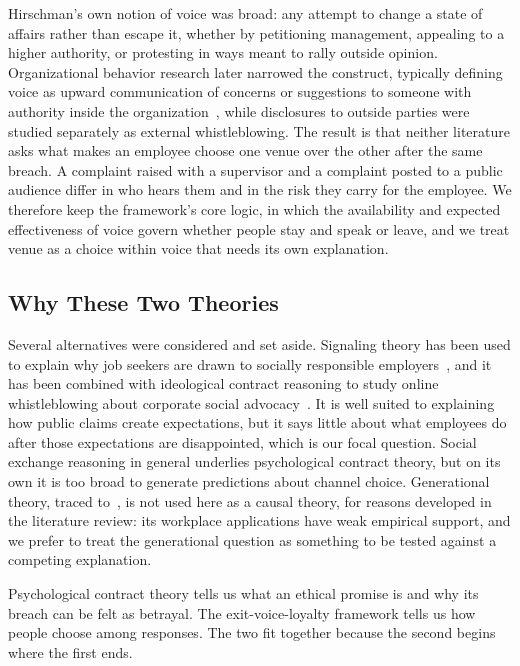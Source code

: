 \documentclass[12pt,a4paper]{article}
\theoremstyle{definition}
\begin{document}
Hirschman's own notion of voice was broad: any attempt to change a state of affairs rather than escape it, whether by petitioning management, appealing to a higher authority, or protesting in ways meant to rally outside opinion. Organizational behavior research later narrowed the construct, typically defining voice as upward communication of concerns or suggestions to someone with authority inside the organization~\citep{morrison2014employee}, while disclosures to outside parties were studied separately as external whistleblowing. The result is that neither literature asks what makes an employee choose one venue over the other after the same breach. A complaint raised with a supervisor and a complaint posted to a public audience differ in who hears them and in the risk they carry for the employee. We therefore keep the framework's core logic, in which the availability and expected effectiveness of voice govern whether people stay and speak or leave, and we treat venue as a choice within voice that needs its own explanation.

\subsection{Why These Two Theories}

Several alternatives were considered and set aside. Signaling theory has been used to explain why job seekers are drawn to socially responsible employers~\citep{jones2014why}, and it has been combined with ideological contract reasoning to study online whistleblowing about corporate social advocacy~\citep{yang2026managing}. It is well suited to explaining how public claims create expectations, but it says little about what employees do after those expectations are disappointed, which is our focal question. Social exchange reasoning in general underlies psychological contract theory, but on its own it is too broad to generate predictions about channel choice. Generational theory, traced to~\citet{mannheim1952problem}, is not used here as a causal theory, for reasons developed in the literature review: its workplace applications have weak empirical support, and we prefer to treat the generational question as something to be tested against a competing explanation.

Psychological contract theory tells us what an ethical promise is and why its breach can be felt as betrayal. The exit-voice-loyalty framework tells us how people choose among responses. The two fit together because the second begins where the first ends.
\end{document}
